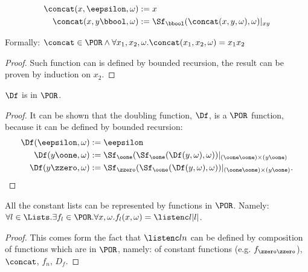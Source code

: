 \begin{conditional}{\notappendix}
  \begin{defn}
    \label{def:concat}
    \begin{align*}
      \concat(x, \eepsilon, \omega) &:= x\\
      \concat(x, y\bbool, \omega) &:= \Sf_\bbool(\concat(x, y, \omega), \omega)|_{xy}
    \end{align*}
  \end{defn}

  \begin{lemma}
    Formally: $\concat \in \POR\land \forall x_1, x_2, \omega. \concat(x_1, x_2, \omega)=x_1x_2$
  \end{lemma}
  \begin{proof}
    Such function can is defined by bounded recursion, the result can be proven
    by induction on $x_2$.
  \end{proof}

  \begin{lemma}[$\Df$ is in $\POR$]
    \label{lemma:dfinpor}
    $\Df$ is in $\POR$.
  \end{lemma}
  \begin{proof}

    It can be shown that the
    {doubling function,
    $\Df$,} is a $\POR$ function, because it can be defined by bounded recursion:
    \begin{align*}
    \Df(\eepsilon,\omega) &:= \eepsilon \\
    \Df(y\oone,\omega) &:=
    {\Sf_\oone(\Sf_\oone(\Df(y,\omega),
    \omega))}|_{(\oone\oone)\times (y\oone)} \\
    \Df(y\zzero,\omega) &:=
    {\Sf_\zzero(\Sf_\oone
    (\Df(y,\omega),\omega))}|_{(\oone\oone)\times
    (y\oone)}.
    \end{align*}
  \end{proof}

  \begin{remark}
    \label{rem:listrepr}
    All the constant lists can be represented by functions in $\POR$. Namely:
    $\forall l \in \Lists. \exists f_l \in \POR. \forall x, \omega.
    f_l(x, \omega) = \listenc l {|l|}$.
  \end{remark}
  \begin{proof}
    This comes form the fact that $\listenc l n$ can be defined by composition
    of functions which are in $\POR$, namely:
    of constant functions (e.g. $f_{\zzero\zzero}$),  $\concat$, $f_n$, $D_f$.
  \end{proof}


\end{conditional}

